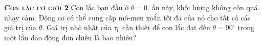 \begin{problem}
\textbf{\textsc{Con lắc cơ giới 2}}
Con lắc ban đầu ở $\theta=0$. ần này, khối lượng không còn quá nhạy cảm. Động cơ có thể cung cấp mô-men xoắn tối đa của nó cho tất cả các giá trị của $\theta$. Giá trị nhỏ nhất của $\tau_0$ cần thiết để con lắc đạt đến $\theta=90^{\circ}$ trong một lần dao động đơn chiều là bao nhiêu?    



\end{problem}
    
